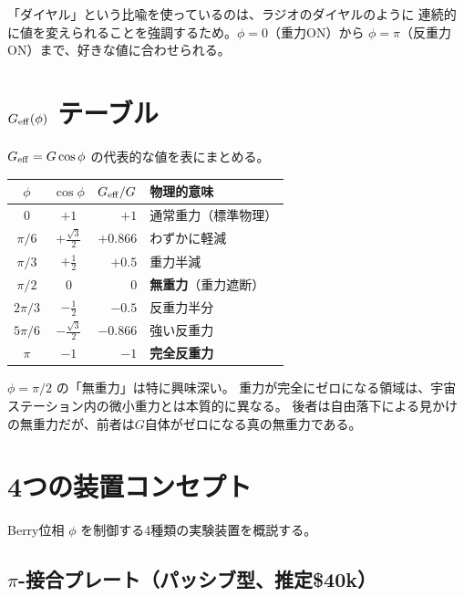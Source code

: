 \begin{hsbox}
「ダイヤル」という比喩を使っているのは、ラジオのダイヤルのように
連続的に値を変えられることを強調するため。$\phi = 0$（重力ON）から
$\phi = \pi$（反重力ON）まで、好きな値に合わせられる。
\end{hsbox}

\section{$G_{\mathrm{eff}}(\phi)$ テーブル}
\label{sec:12.2}

$G_{\mathrm{eff}} = G\cos\phi$ の代表的な値を表にまとめる。

\begin{center}
\begin{tabular}{ccrl}
\toprule
$\phi$ & $\cos\phi$ & $G_{\mathrm{eff}}/G$ & 物理的意味 \\
\midrule
$0$      & $+1$   & $+1$    & 通常重力（標準物理） \\
$\pi/6$  & $+\frac{\sqrt{3}}{2}$ & $+0.866$ & わずかに軽減 \\
$\pi/3$  & $+\frac{1}{2}$ & $+0.5$  & 重力半減 \\
$\pi/2$  & $0$    & $0$     & \textbf{無重力}（重力遮断） \\
$2\pi/3$ & $-\frac{1}{2}$ & $-0.5$  & 反重力半分 \\
$5\pi/6$ & $-\frac{\sqrt{3}}{2}$ & $-0.866$ & 強い反重力 \\
$\pi$    & $-1$   & $-1$    & \textbf{完全反重力} \\
\bottomrule
\end{tabular}
\end{center}

$\phi = \pi/2$ の「無重力」は特に興味深い。
重力が完全にゼロになる領域は、宇宙ステーション内の微小重力とは本質的に異なる。
後者は自由落下による見かけの無重力だが、前者は$G$自体がゼロになる真の無重力である。

\section{4つの装置コンセプト}
\label{sec:12.3}

Berry位相 $\phi$ を制御する4種類の実験装置を概説する。

\subsection{$\pi$-接合プレート（パッシブ型、推定\$40k）}

